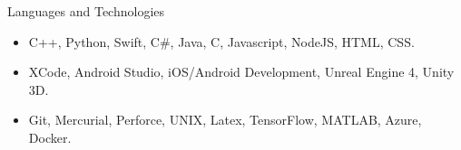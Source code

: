 \documentclass[]{mcdowellcv}
\begin{document}
	\begin{cvsection}{Languages and Technologies}
		\begin{cvsubsection}{}{}{}	
			\begin{itemize}
				\item C++, Python, Swift, C\#, Java, C, Javascript, NodeJS, HTML, CSS.
				\item XCode, Android Studio, iOS/Android Development, Unreal Engine 4, Unity 3D.
				\item Git, Mercurial, Perforce, UNIX, Latex, TensorFlow, MATLAB, Azure, Docker.
			\end{itemize}
		\end{cvsubsection}
	\end{cvsection}
	
\end{document}
